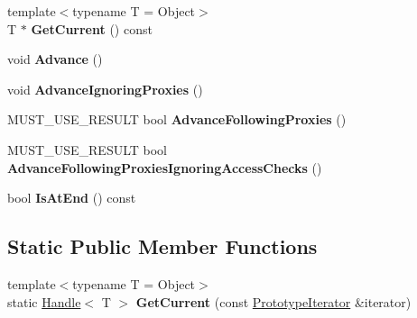 \begin{DoxyCompactItemize}
\item 
{\footnotesize template$<$typename T  = Object$>$ }\\T $\ast$ {\bfseries Get\+Current} () const \hypertarget{classv8_1_1internal_1_1_prototype_iterator_a79eb8c7563e31030b3c2a3bd46114547}{}\label{classv8_1_1internal_1_1_prototype_iterator_a79eb8c7563e31030b3c2a3bd46114547}

\item 
void {\bfseries Advance} ()\hypertarget{classv8_1_1internal_1_1_prototype_iterator_aac13aff50ca8b7566887d078e4102ff8}{}\label{classv8_1_1internal_1_1_prototype_iterator_aac13aff50ca8b7566887d078e4102ff8}

\item 
void {\bfseries Advance\+Ignoring\+Proxies} ()\hypertarget{classv8_1_1internal_1_1_prototype_iterator_ab057cee4da776bc58be4bd5275a00e59}{}\label{classv8_1_1internal_1_1_prototype_iterator_ab057cee4da776bc58be4bd5275a00e59}

\item 
M\+U\+S\+T\+\_\+\+U\+S\+E\+\_\+\+R\+E\+S\+U\+LT bool {\bfseries Advance\+Following\+Proxies} ()\hypertarget{classv8_1_1internal_1_1_prototype_iterator_a0c6cd20165392002b48ca1dcb6314bbb}{}\label{classv8_1_1internal_1_1_prototype_iterator_a0c6cd20165392002b48ca1dcb6314bbb}

\item 
M\+U\+S\+T\+\_\+\+U\+S\+E\+\_\+\+R\+E\+S\+U\+LT bool {\bfseries Advance\+Following\+Proxies\+Ignoring\+Access\+Checks} ()\hypertarget{classv8_1_1internal_1_1_prototype_iterator_af574f23c8b2e72177edd0d2f9c79f964}{}\label{classv8_1_1internal_1_1_prototype_iterator_af574f23c8b2e72177edd0d2f9c79f964}

\item 
bool {\bfseries Is\+At\+End} () const \hypertarget{classv8_1_1internal_1_1_prototype_iterator_acaef36cbbeb0ae0dadbfcfc3414a5a5f}{}\label{classv8_1_1internal_1_1_prototype_iterator_acaef36cbbeb0ae0dadbfcfc3414a5a5f}

\end{DoxyCompactItemize}
\subsection*{Static Public Member Functions}
\begin{DoxyCompactItemize}
\item 
{\footnotesize template$<$typename T  = Object$>$ }\\static \hyperlink{classv8_1_1internal_1_1_handle}{Handle}$<$ T $>$ {\bfseries Get\+Current} (const \hyperlink{classv8_1_1internal_1_1_prototype_iterator}{Prototype\+Iterator} \&iterator)\hypertarget{classv8_1_1internal_1_1_prototype_iterator_a2dad7933aebf24bafd3c8d5db1271824}{}\label{classv8_1_1internal_1_1_prototype_iterator_a2dad7933aebf24bafd3c8d5db1271824}

\end{DoxyCompactItemize}
